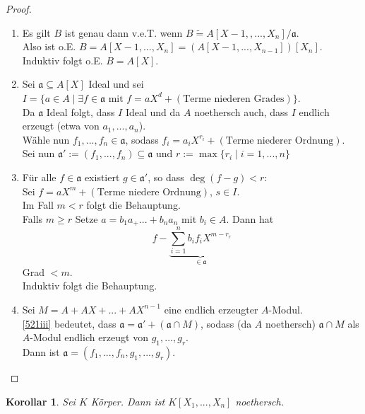 \documentclass[10pt,a4paper]{article}
\newcommand{\isomorph}{\ensuremath{\tilde{=}}}
\newcounter{thm}[section]
\theoremstyle{definition}
\theoremstyle{plain}
\newtheorem{kor}[thm]{Korollar}
\theoremstyle{remark}
\begin{document}
\begin{proof}
	\begin{enumerate}
		\item Es gilt $B$ ist genau dann v.e.T. wenn $B\isomorph A[X-1,,...,X_n]/\mathfrak a$.\\
		Also ist o.E. $B=A[X-1,...,X_n]=(A[X-1,...,X_{n-1}])[X_n]$.\\
		Induktiv folgt o.E. $B=A[X]$.
		
		\item Sei $\mathfrak a\subseteq A[X]$ Ideal und sei \\
		$I=\{a\in A\mid\exists f\in\mathfrak a\text{ mit }f=aX^d+(\text{Terme niederen Grades})\}$.\\
		Da $\mathfrak a$ Ideal folgt, dass $I$ Ideal und da $A$ noethersch auch, dass $I$ endlich erzeugt (etwa von $a_1,...,a_n$).\\
		Wähle nun $f_1,...,f_n\in\mathfrak a$, sodass $f_i=a_iX^{r_i}+(\text{Terme niederer Ordnung})$.\\
		Sei nun $\mathfrak a':=(f_1,...,f_n)\subseteq \mathfrak a$ und $r:=\max\{r_i\mid i=1,...,n\}$
		
		\item \label{521iii}Für alle $f\in \mathfrak a$ existiert $g\in\mathfrak a'$, so dass $\deg(f-g)<r$:\\
		Sei $f=aX^m+(\text{Terme niedere Ordnung})$, $s\in I$.\\
		Im Fall $m<r$ folgt die Behauptung.\\
		Falls $m\geq r$ Setze $a=b_1a_+...+b_na_n$ mit $b_i\in A$. Dann hat
		\[f-\underbrace{\sum_{i=1}^{n}b_if_iX^{m-r_r}}_{\in\mathfrak a}\]
		Grad $<m$.\\
		Induktiv folgt die Behauptung.
		
		\item Sei $M=A+AX+...+AX^{n-1}$ eine endlich erzeugter $A$-Modul.\\
		\ref{521iii} bedeutet, dass $\mathfrak a=\mathfrak a'+(\mathfrak a\cap M)$, sodass (da $A$ noethersch) $\mathfrak a\cap M$ als $A$-Modul endlich erzeugt von $g_1,...,g_r$.\\
		Dann ist $\mathfrak a=(f_1,...,f_n,g_1,...,g_r)$.
	\end{enumerate}
\end{proof}

\begin{kor}\label{522kor}
	Sei $K$ Körper. Dann ist $K[X_1,...,X_n]$ noethersch.
\end{kor}
\end{document}
